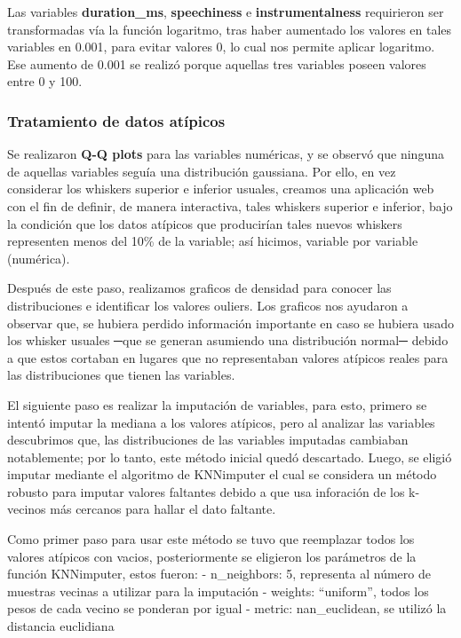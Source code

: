 \documentclass[
  letterpaper,
  DIV=11,
  numbers=noendperiod]{scrartcl}
\begin{document}
Las variables \textbf{duration\_ms}, \textbf{speechiness} e
\textbf{instrumentalness} requirieron ser transformadas vía la función
logaritmo, tras haber aumentado los valores en tales variables en 0.001,
para evitar valores 0, lo cual nos permite aplicar logaritmo. Ese
aumento de 0.001 se realizó porque aquellas tres variables poseen
valores entre 0 y 100.

\hypertarget{tratamiento-de-datos-atuxedpicos}{%
\subsubsection{Tratamiento de datos
atípicos}\label{tratamiento-de-datos-atuxedpicos}}

Se realizaron \textbf{Q-Q plots} para las variables numéricas, y se
observó que ninguna de aquellas variables seguía una distribución
gaussiana. Por ello, en vez considerar los whiskers superior e inferior
usuales, creamos una aplicación web con el fin de definir, de manera
interactiva, tales whiskers superior e inferior, bajo la condición que
los datos atípicos que producirían tales nuevos whiskers representen
menos del 10\% de la variable; así hicimos, variable por variable
(numérica).

Después de este paso, realizamos graficos de densidad para conocer las
distribuciones e identificar los valores ouliers. Los graficos nos
ayudaron a observar que, se hubiera perdido información importante en
caso se hubiera usado los whisker usuales ─que se generan asumiendo una
distribución normal─ debido a que estos cortaban en lugares que no
representaban valores atípicos reales para las distribuciones que tienen
las variables.

El siguiente paso es realizar la imputación de variables, para esto,
primero se intentó imputar la mediana a los valores atípicos, pero al
analizar las variables descubrimos que, las distribuciones de las
variables imputadas cambiaban notablemente; por lo tanto, este método
inicial quedó descartado. Luego, se eligió imputar mediante el algoritmo
de KNNimputer el cual se considera un método robusto para imputar
valores faltantes debido a que usa inforación de los k-vecinos más
cercanos para hallar el dato faltante.

Como primer paso para usar este método se tuvo que reemplazar todos los
valores atípicos con vacios, posteriormente se eligieron los parámetros
de la función KNNimputer, estos fueron: - n\_neighbors: 5, representa al
número de muestras vecinas a utilizar para la imputación - weights:
``uniform'', todos los pesos de cada vecino se ponderan por igual -
metric: nan\_euclidean, se utilizó la distancia euclidiana
\end{document}
